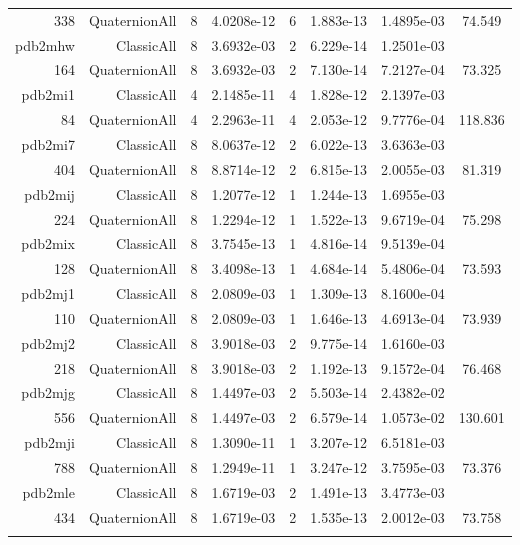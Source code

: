 \begin{xltabular}{\textwidth}{r|rcS[table-format=1.4e+2]cS[table-format=1.3e+2]S[table-format=1.4e+2]S[table-format=-1.3]}
338 & QuaternionAll & 8 & 4.0208e-12 & 6 & 1.883e-13 & 1.4895e-03 & 74.549\\  \addlinespace
pdb2mhw & ClassicAll & 8 & 3.6932e-03 & 2 & 6.229e-14 & 1.2501e-03 & \\
164 & QuaternionAll & 8 & 3.6932e-03 & 2 & 7.130e-14 & 7.2127e-04 & 73.325\\  \addlinespace
pdb2mi1 & ClassicAll & 4 & 2.1485e-11 & 4 & 1.828e-12 & 2.1397e-03 & \\
84 & QuaternionAll & 4 & 2.2963e-11 & 4 & 2.053e-12 & 9.7776e-04 & 118.836\\  \addlinespace
pdb2mi7 & ClassicAll & 8 & 8.0637e-12 & 2 & 6.022e-13 & 3.6363e-03 & \\
404 & QuaternionAll & 8 & 8.8714e-12 & 2 & 6.815e-13 & 2.0055e-03 & 81.319\\  \addlinespace
pdb2mij & ClassicAll & 8 & 1.2077e-12 & 1 & 1.244e-13 & 1.6955e-03 & \\
224 & QuaternionAll & 8 & 1.2294e-12 & 1 & 1.522e-13 & 9.6719e-04 & 75.298\\  \addlinespace
pdb2mix & ClassicAll & 8 & 3.7545e-13 & 1 & 4.816e-14 & 9.5139e-04 & \\
128 & QuaternionAll & 8 & 3.4098e-13 & 1 & 4.684e-14 & 5.4806e-04 & 73.593\\  \addlinespace
pdb2mj1 & ClassicAll & 8 & 2.0809e-03 & 1 & 1.309e-13 & 8.1600e-04 & \\
110 & QuaternionAll & 8 & 2.0809e-03 & 1 & 1.646e-13 & 4.6913e-04 & 73.939\\  \addlinespace
pdb2mj2 & ClassicAll & 8 & 3.9018e-03 & 2 & 9.775e-14 & 1.6160e-03 & \\
218 & QuaternionAll & 8 & 3.9018e-03 & 2 & 1.192e-13 & 9.1572e-04 & 76.468\\  \addlinespace
pdb2mjg & ClassicAll & 8 & 1.4497e-03 & 2 & 5.503e-14 & 2.4382e-02 & \\
556 & QuaternionAll & 8 & 1.4497e-03 & 2 & 6.579e-14 & 1.0573e-02 & 130.601\\  \addlinespace
pdb2mji & ClassicAll & 8 & 1.3090e-11 & 1 & 3.207e-12 & 6.5181e-03 & \\
788 & QuaternionAll & 8 & 1.2949e-11 & 1 & 3.247e-12 & 3.7595e-03 & 73.376\\  \addlinespace
pdb2mle & ClassicAll & 8 & 1.6719e-03 & 2 & 1.491e-13 & 3.4773e-03 & \\
434 & QuaternionAll & 8 & 1.6719e-03 & 2 & 1.535e-13 & 2.0012e-03 & 73.758\\  \addlinespace

\end{xltabular}
